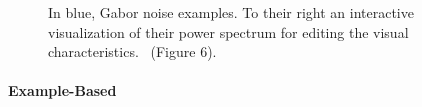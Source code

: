 \begin{figure}[H]
    \centering
    \caption{\label{fig:galerne_2012_gne}In blue, Gabor noise examples. To their right an interactive visualization of their power spectrum for editing the visual characteristics.~\cite{galerne_2012_gne} (Figure 6). \color{orange}{Status rights: invoice received.}}
\end{figure}

\paragraph*{Example-Based}
\label{para:analysis_stochastic_examplebased_control}

